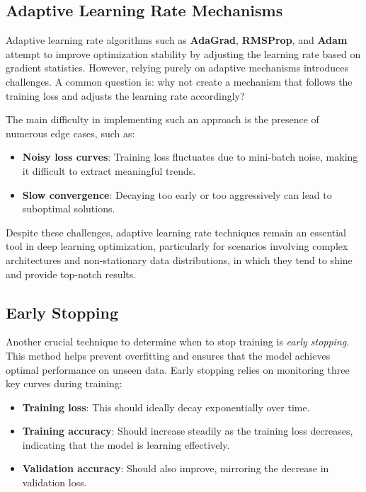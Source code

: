 \newpage
\subsection{Adaptive Learning Rate Mechanisms}
\label{subsec:adaptive_lr}

\noindent Adaptive learning rate algorithms such as \textbf{AdaGrad}, \textbf{RMSProp}, and \textbf{Adam} attempt to improve optimization stability by adjusting the learning rate based on gradient statistics. However, relying purely on adaptive mechanisms introduces challenges. A common question is: why not create a mechanism that follows the training loss and adjusts the learning rate accordingly?

\noindent The main difficulty in implementing such an approach is the presence of numerous edge cases, such as:
\begin{itemize}
	\item \textbf{Noisy loss curves}: Training loss fluctuates due to mini-batch noise, making it difficult to extract meaningful trends.
	\item \textbf{Slow convergence}: Decaying too early or too aggressively can lead to suboptimal solutions.
\end{itemize}

\noindent Despite these challenges, adaptive learning rate techniques remain an essential tool in deep learning optimization, particularly for scenarios involving complex architectures and non-stationary data distributions, in which they tend to shine and provide top-notch results.

\subsection{Early Stopping}
\label{subsec:early_stopping}

Another crucial technique to determine when to stop training is \emph{early stopping}. This method helps prevent overfitting and ensures that the model achieves optimal performance on unseen data. Early stopping relies on monitoring three key curves during training:
\begin{itemize}
	\item \textbf{Training loss}: This should ideally decay exponentially over time.
	\item \textbf{Training accuracy}: Should increase steadily as the training loss decreases, indicating that the model is learning effectively.
	\item \textbf{Validation accuracy}: Should also improve, mirroring the decrease in validation loss.
\end{itemize}

